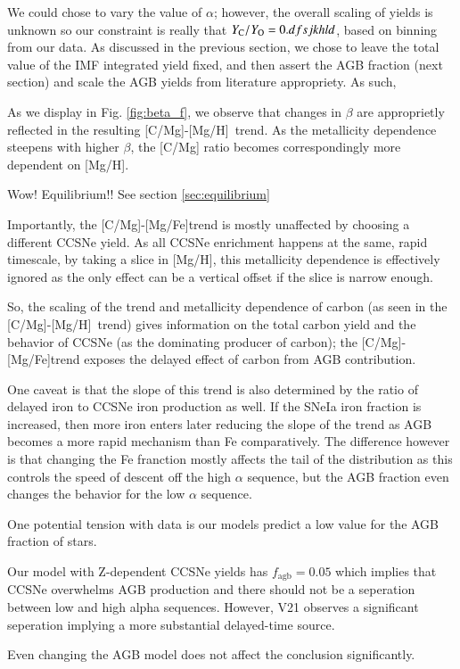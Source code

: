 \documentclass[12pt,oneside]{report}
\newcommand{\caah}{[C/Mg]-[Mg/H]}
\newcommand{\caafe}{[C/Mg]-[Mg/Fe]}
\begin{document}
We could chose to vary the value of $\alpha$; however, the overall scaling of
yields is unknown so our constraint is really that $Y_{\rm C}/Y_{\rm O} =
0.dfsjkhld$, based on binning from our data. As discussed in the previous
section, we chose to leave the total value of the IMF integrated yield fixed,
and then assert the AGB fraction (next section) and scale the AGB yields from
literature appropriety. As such, 

As we display in Fig. \ref{fig:beta_f}, we observe that changes in $\beta$ are
approprietly reflected in the resulting \caah~trend. As the metallicity
dependence steepens with higher $\beta$, the [C/Mg] ratio becomes
correspondingly more dependent on [Mg/H].

Wow! Equilibrium!! See section \ref{sec:equilibrium}

Importantly, the \caafe trend is mostly unaffected by choosing a different
CCSNe yield. As all CCSNe enrichment happens at the same, rapid timescale, by
taking a slice in [Mg/H], this metallicity dependence is effectively ignored as
the only effect can be a vertical offset if the slice is narrow enough. 

So, the scaling of the trend and metallicity dependence of carbon (as seen in
the \caah~trend) gives information on the total carbon yield and the behavior
of CCSNe (as the dominating producer of carbon);
the \caafe trend exposes the delayed effect of carbon from AGB contribution.

One caveat is that the slope of this trend is also determined by the ratio of delayed iron to CCSNe iron production as well. If the SNeIa iron fraction is increased, then more iron enters later reducing the slope of the trend as AGB becomes a more rapid mechanism than Fe comparatively. The difference however is that changing the Fe franction mostly affects the tail of the distribution as this controls the speed of descent off the high $\alpha$ sequence, but the AGB fraction even changes the behavior for the low $\alpha$ sequence.

One potential tension with data is our models predict a low value for the AGB fraction of stars. 

Our model with Z-dependent CCSNe yields has $f_\text{agb} = 0.05$ which implies that CCSNe overwhelms AGB production and there should not be a seperation between low and high alpha sequences. However, V21 observes a significant seperation implying a more substantial delayed-time source. 

Even changing the AGB model does not affect the conclusion significantly. 
\end{document}
